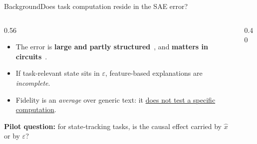 \documentclass[aspectratio=169,10pt]{beamer}
\newcommand{\stage}[1]{{\color{accent}#1}\;\textperiodcentered\;} %
\begin{document}
\begin{frame}{\stage{Background}Does task computation reside in the SAE error?}
  \begin{columns}[c]
    \begin{column}{0.56\textwidth}
      \begin{itemize}\setlength{\itemsep}{8pt}
        \item The error is \textbf{large and partly structured}~\citep{engels2025dark}, and \textbf{matters in
          circuits}~\citep{marks2025sparse}.
        \item If task-relevant state sits in $\varepsilon$, feature-based explanations are \emph{incomplete}.
        \item Fidelity is an \emph{average} over generic text: it \uline{does not test a specific computation}.
      \end{itemize}
      \vspace{10pt}
      \textbf{Pilot question:} for state-tracking tasks, is the causal effect carried by $\hat{x}$ or by $\varepsilon$?
    \end{column}
    \begin{column}{0.40\textwidth}
      \centering
    \end{column}
  \end{columns}
\end{frame}
\end{document}
